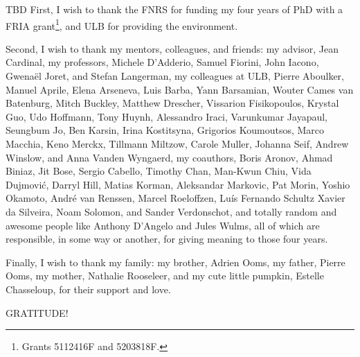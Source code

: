 
\ifdraft%
TBD
\else%
First, I wish to thank the FNRS for funding my four years of PhD with a FRIA
grant\footnote{%
Grants 5112416F and 5203818F.%
}, and ULB for providing the environment.

Second, I wish to thank my mentors, colleagues, and friends:
%
my advisor,
Jean Cardinal,
%
my professors,
Michele D'Adderio,
Samuel Fiorini,
John Iacono,
Gwenaël Joret,
and
Stefan Langerman,
%
my colleagues at ULB,
Pierre Aboulker,
Manuel Aprile,
Elena Arseneva,
Luis Barba,
Yann Barsamian,
Wouter Cames van Batenburg,
Mitch Buckley,
Matthew Drescher,
Vissarion Fisikopoulos,
Krystal Guo,
Udo Hoffmann,
Tony Huynh,
Alessandro Iraci,
Varunkumar Jayapaul,
Seungbum Jo,
Ben Karsin,
Irina Kostitsyna,
Grigorios Koumoutsos,
Marco Macchia,
Keno Merckx,
Tillmann Miltzow,
Carole Muller,
Johanna Seif,
Andrew Winslow,
and
Anna Vanden Wyngaerd,
%
my coauthors,
Boris Aronov,
Ahmad Biniaz,
Jit Bose,
Sergio Cabello,
Timothy Chan,
Man-Kwun Chiu,
Vida Dujmovi\'c,
Darryl Hill,
Matias Korman,
Aleksandar Markovic,
Pat Morin,
Yoshio Okamoto,
André van Renssen,
Marcel Roeloffzen,
Luís Fernando Schultz Xavier da Silveira,
Noam Solomon,
and
Sander Verdonschot,
%
and
%
totally random and awesome people like
Anthony D'Angelo
and
Jules Wulms,
all of which are responsible, in some way or another, for giving meaning to
those four years.

Finally, I wish to thank my family:
my brother, Adrien Ooms,
my father, Pierre Ooms,
my mother, Nathalie Rooseleer,
%
and
%
my cute little pumpkin, Estelle Chasseloup,
for their support and love.

\vspace{\fill}
\centerline{\LARGE GRATITUDE!}
\vspace{\fill}
